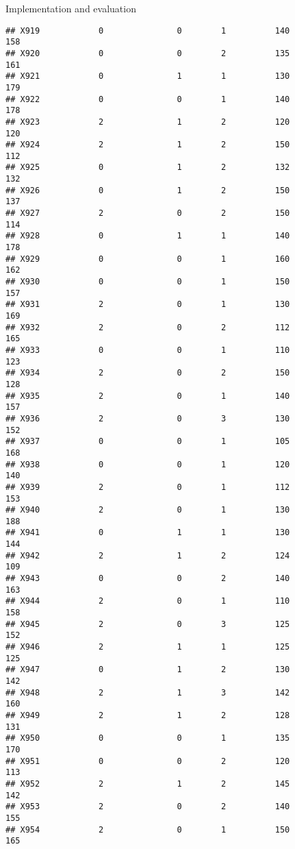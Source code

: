 \documentclass[
  ignorenonframetext,
]{beamer}
\begin{document}
\begin{frame}[fragile]{Implementation and evaluation}
\begin{verbatim}
## X919            0               0        1          140            158
## X920            0               0        2          135            161
## X921            0               1        1          130            179
## X922            0               0        1          140            178
## X923            2               1        2          120            120
## X924            2               1        2          150            112
## X925            0               1        2          132            132
## X926            0               1        2          150            137
## X927            2               0        2          150            114
## X928            0               1        1          140            178
## X929            0               0        1          160            162
## X930            0               0        1          150            157
## X931            2               0        1          130            169
## X932            2               0        2          112            165
## X933            0               0        1          110            123
## X934            2               0        2          150            128
## X935            2               0        1          140            157
## X936            2               0        3          130            152
## X937            0               0        1          105            168
## X938            0               0        1          120            140
## X939            2               0        1          112            153
## X940            2               0        1          130            188
## X941            0               1        1          130            144
## X942            2               1        2          124            109
## X943            0               0        2          140            163
## X944            2               0        1          110            158
## X945            2               0        3          125            152
## X946            2               1        1          125            125
## X947            0               1        2          130            142
## X948            2               1        3          142            160
## X949            2               1        2          128            131
## X950            0               0        1          135            170
## X951            0               0        2          120            113
## X952            2               1        2          145            142
## X953            2               0        2          140            155
## X954            2               0        1          150            165

\end{verbatim}
\end{frame}
\end{document}
